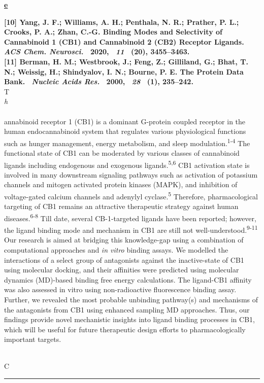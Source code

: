 \documentclass[titlepage,oneside,openany,10pt]{book}
\newenvironment{posterabswref}[5] %
        {
        \newcommand{\posterref}{#5}
	\begin{flushright}
                \underline{\textbf{#4}}
        \end{flushright}
        \textbf{#1}\\%
        #2\\%
        \textit{#3}\\\\%
        }
        {
        \vspace{0.5cm}
        \\\noindent \posterref \\ \noindent\rule{15cm}{0.5pt}%
        }
\begin{document}
\begin{posterabswref}
{    {[10]} Yang, J. F.; Williams, A. H.; Penthala, N. R.; Prather, P. L.; Crooks, P. A.; Zhan, C.-G. Binding Modes and Selectivity of Cannabinoid 1 (CB1) and Cannabinoid 2 (CB2) Receptor Ligands.~ \emph{ACS Chem. Neurosci.} ~2020,~ \emph{11} ~(20), 3455--3463.\\
    {[11]} Berman, H. M.; Westbrook, J.; Feng, Z.; Gilliland, G.; Bhat, T. N.; Weissig, H.; Shindyalov, I. N.; Bourne, P. E. The Protein Data Bank.~ \emph{Nucleic Acids Res.} ~2000,~ \emph{28} ~(1), 235--242.
    }
    The Cannabinoid receptor 1 (CB1) is a dominant G-protein coupled receptor in the human endocannabinoid system that regulates various physiological functions such as hunger management, energy metabolism, and sleep modulation.\textsuperscript{1-4} The functional state of CB1 can be moderated by various classes of cannabinoid ligands including endogenous and exogenous ligands.\textsuperscript{5,6} CB1 activation state is involved in many downstream signaling pathways such as activation of potassium channels and mitogen activated protein kinases (MAPK), and inhibition of voltage-gated calcium channels and adenylyl cyclase.\textsuperscript{5} Therefore, pharmacological targeting of CB1 remains an attractive therapeutic strategy against human diseases.\textsuperscript{6-8} Till date, several CB-1-targeted ligands have been reported; however, the ligand binding mode and mechanism in CB1 are still not well-understood.\textsuperscript{9-11} Our research is aimed at bridging this knowledge-gap using a combination of computational approaches and \emph{in vitro} binding assays. We modelled the interactions of a select group of antagonists against the inactive-state of CB1 using molecular docking, and their affinities were predicted using molecular dynamics (MD)-based binding free energy calculations. The ligand-CB1 affinity was also assessed in vitro using non-radioactive fluorescence binding assay. Further, we revealed the most probable unbinding pathway(s) and mechanisms of the antagonists from CB1 using enhanced sampling MD approaches. Thus, our findings provide novel mechanistic insights into ligand binding processes in CB1, which will be useful for future therapeutic design efforts to pharmacologically important targets.
    \label{SuS}
\end{posterabswref}

\newpage
\end{document}
